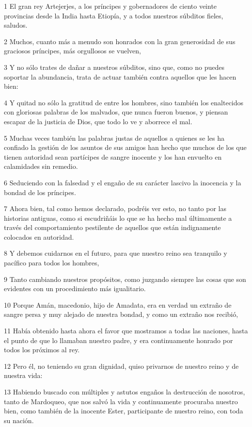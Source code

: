 \par 1 El gran rey Artejerjes, a los príncipes y gobernadores de ciento veinte provincias desde la India hasta Etiopía, y a todos nuestros súbditos fieles, saludos.
\par 2 Muchos, cuanto más a menudo son honrados con la gran generosidad de sus graciosos príncipes, más orgullosos se vuelven,
\par 3 Y no sólo trates de dañar a nuestros súbditos, sino que, como no puedes soportar la abundancia, trata de actuar también contra aquellos que les hacen bien:
\par 4 Y quitad no sólo la gratitud de entre los hombres, sino también los enaltecidos con gloriosas palabras de los malvados, que nunca fueron buenos, y piensan escapar de la justicia de Dios, que todo lo ve y aborrece el mal.
\par 5 Muchas veces también las palabras justas de aquellos a quienes se les ha confiado la gestión de los asuntos de sus amigos han hecho que muchos de los que tienen autoridad sean partícipes de sangre inocente y los han envuelto en calamidades sin remedio.
\par 6 Seduciendo con la falsedad y el engaño de su carácter lascivo la inocencia y la bondad de los príncipes.
\par 7 Ahora bien, tal como hemos declarado, podréis ver esto, no tanto por las historias antiguas, como si escudriñáis lo que se ha hecho mal últimamente a través del comportamiento pestilente de aquellos que están indignamente colocados en autoridad.
\par 8 Y debemos cuidarnos en el futuro, para que nuestro reino sea tranquilo y pacífico para todos los hombres,
\par 9 Tanto cambiando nuestros propósitos, como juzgando siempre las cosas que son evidentes con un procedimiento más igualitario.
\par 10 Porque Amán, macedonio, hijo de Amadata, era en verdad un extraño de sangre persa y muy alejado de nuestra bondad, y como un extraño nos recibió,
\par 11 Había obtenido hasta ahora el favor que mostramos a todas las naciones, hasta el punto de que lo llamaban nuestro padre, y era continuamente honrado por todos los próximos al rey.
\par 12 Pero él, no teniendo su gran dignidad, quiso privarnos de nuestro reino y de nuestra vida:
\par 13 Habiendo buscado con múltiples y astutos engaños la destrucción de nosotros, tanto de Mardoqueo, que nos salvó la vida y continuamente procuraba nuestro bien, como también de la inocente Ester, participante de nuestro reino, con toda su nación.
